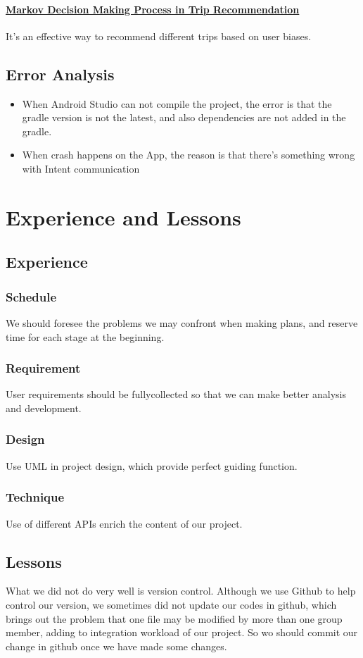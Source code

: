 \documentclass[10pt]{article}
\begin{document}
\paragraph{\underline{Markov Decision Making Process in Trip Recommendation}} It’s an effective way to recommend different trips based on user biases.

\subsection{Error Analysis}
\begin{itemize}
	\item When Android Studio can not compile the project, the error is that the gradle version is not the latest, and also dependencies are not added in the gradle.
	\item When crash happens on the App, the reason is that there’s something wrong with Intent communication
	
\end{itemize}

\section{Experience and Lessons}
\subsection{Experience}
\subsubsection{Schedule}
We should foresee the problems we may confront when making plans, and reserve time for each stage at the beginning.

\subsubsection{Requirement}
User requirements should be fullycollected so that we can make better analysis and development.

\subsubsection{Design}
Use UML in project design, which provide perfect guiding function.

\subsubsection{Technique} 
Use of different APIs enrich the content of our project.

\subsection{Lessons}
What we did not do very well is version control. Although we use Github to help control our version, we sometimes did not update our codes in github, which brings out the problem that one file may be modified by more than one group member, adding to integration workload of our project. So wo should commit our change in github once we have made some changes.
\end{document}
